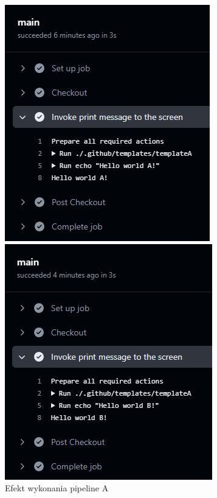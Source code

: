 \documentclass{article}
\begin{document}
\begin{figure}[H]
    \centering
    \begin{minipage}[b]{0.45\textwidth}
        \centering
        \includegraphics[width=\linewidth]{testPipelinesPipelineA.png}
        \caption{Efekt wykonania pipeline A}
        \label{fig:enter-label-a}
    \end{minipage}
    \hfill
    \begin{minipage}[b]{0.45\textwidth}
        \centering
        \includegraphics[width=\linewidth]{testPipelinesPipelineB.png}

\end{minipage}
\end{figure}
\end{document}
